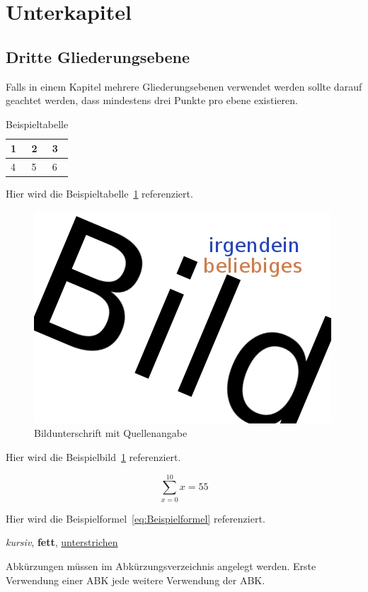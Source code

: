 \section{Unterkapitel}
\subsection{Dritte Gliederungsebene}
Falls in einem Kapitel mehrere Gliederungsebenen verwendet werden sollte darauf geachtet werden, dass mindestens drei Punkte pro ebene existieren. 

\begin{table}[h]
	\centering
	\begin{tabular}{|l|l|l|}
		\hline
		1&2&3\\\hline
		4&5&6\\\hline
	\end{tabular}
	\caption{Beispieltabelle}
	\label{Tab:Beispieltabelle}
\end{table}

Hier wird die Beispieltabelle~\ref{Tab:Beispieltabelle} referenziert.

\begin{figure}[h] %
	\centering
	\includegraphics[scale=.25]{abbildungen/bild1}
	\caption[Bildunterschrift mit Quellenangabe]{Bildunterschrift mit Quellenangabe \cite{lcd}}
	\label{Fig:Bildbezeichnung}
\end{figure}

Hier wird die Beispielbild~\ref{Fig:Bildbezeichnung} referenziert.

\begin{equation} \label{eq:Beispielformel}
	\sum_{x=0}^{10}x=55
\end{equation}

Hier wird die Beispielformel~\ref{eq:Beispielformel} referenziert.

\textit{kursiv}, \textbf{fett}, \underline{unterstrichen}

Abkürzungen müssen im Abkürzungsverzeichnis angelegt werden.
Erste Verwendung einer \ac{ABK} jede weitere Verwendung der \ac{ABK}.

\nocite{*}

